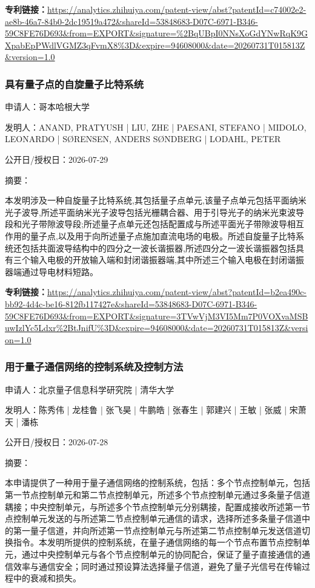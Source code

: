\documentclass[12pt,a4paper]{ctexart}
\begin{document}
\noindent\textbf{专利链接：}\url{https://analytics.zhihuiya.com/patent-view/abst?patentId=c74002e2-ae8b-46a7-84b0-2dc19519a472&shareId=53848683-D07C-6971-B346-59C8FE76D693&from=EXPORT&signature=%2BqUBpI0NNsXoGdYNwRqK9GXpabEpPWdlVGMZ3qFvmX8%3D&expire=94608000&date=20260731T015813Z&version=1.0}

\subsubsection{ 具有量子点的自旋量子比特系统 }

申请人：哥本哈根大学

发明人：ANAND, PRATYUSH | LIU, ZHE | PAESANI, STEFANO | MIDOLO, LEONARDO | SØRENSEN, ANDERS SØNDBERG | LODAHL, PETER

公开日/授权日：2026-07-29

摘要：

本发明涉及一种自旋量子比特系统,其包括量子点单元,该量子点单元包括平面纳米光子波导,所述平面纳米光子波导包括光栅耦合器、用于引导光子的纳米光束波导段和光子带隙波导段;所述量子点单元还包括配置成与所述平面光子带隙波导相互作用的量子点,以及用于向所述量子点施加直流电场的电极。所述自旋量子比特系统还包括共面波导结构中的四分之一波长谐振器,所述四分之一波长谐振器包括具有三个输入电极的开放输入端和封闭谐振器端,其中所述三个输入电极在封闭谐振器端通过导电材料短路。

\noindent\textbf{专利链接：}\url{https://analytics.zhihuiya.com/patent-view/abst?patentId=b2ea490c-bb92-4d4c-be16-812fb117427e&shareId=53848683-D07C-6971-B346-59C8FE76D693&from=EXPORT&signature=3TVwVjM3VI5Mm7P0VOXvaMSBuwIzlYc5Ldxr%2BtJnifU%3D&expire=94608000&date=20260731T015813Z&version=1.0}

\subsubsection{ 用于量子通信网络的控制系统及控制方法 }

申请人：北京量子信息科学研究院 | 清华大学

发明人：陈秀伟 | 龙桂鲁 | 张飞昊 | 牛鹏皓 | 张春生 | 郭建兴 | 王敏 | 张威 | 宋萧天 | 潘栋

公开日/授权日：2026-07-28

摘要：

本申请提供了一种用于量子通信网络的控制系统，包括：多个节点控制单元，包括第一节点控制单元和第二节点控制单元，所述多个节点控制单元通过多条量子信道耦接；中央控制单元，与所述多个节点控制单元分别耦接，配置成接收所述第一节点控制单元发送的与所述第二节点控制单元通信的请求，选择所述多条量子信道中的第一量子信道，并向所述第一节点控制单元与所述第二节点控制单元发送信道切换指令。本发明所提供的控制系统，在量子通信网络的每一个节点布置节点控制单元，通过中央控制单元与各个节点控制单元的协同配合，保证了量子直接通信的通信效率与通信安全；同时通过预设算法选择量子信道，避免了量子光信号在传输过程中的衰减和损失。
\end{document}
